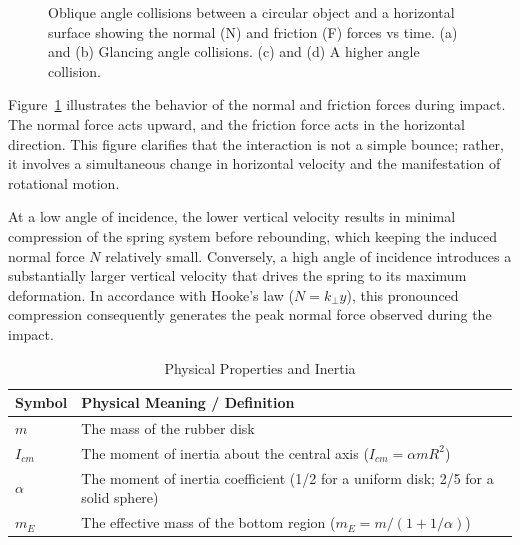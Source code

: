 \documentclass[11pt,letterpaper]{article}
\begin{document}
\begin{figure}[h!]
\caption{Oblique angle collisions between a circular object and a horizontal surface showing the normal (N) and friction (F) forces vs time. (a) and (b) Glancing angle collisions. (c) and (d) A higher angle collision.}
\label{fig:sample_plot}
\end{figure}

\noindent Figure~\ref{fig:sample_plot} illustrates the behavior of the normal and friction forces during impact. The normal force acts upward, and the friction force acts in the horizontal direction. This figure clarifies that the interaction is not a simple bounce; rather, it involves a simultaneous change in horizontal velocity and the manifestation of rotational motion.

At a low angle of incidence, the lower vertical velocity results in minimal compression of the spring system before rebounding, which keeping the induced normal force $N$ relatively small. Conversely, a high angle of incidence introduces a substantially larger vertical velocity that drives the spring to its maximum deformation. In accordance with Hooke's law ($N = k_\perp y$), this pronounced compression consequently generates the peak normal force observed during the impact.

\begin{table}[h!]   
\centering
\caption{Physical Properties and Inertia}
\label{tab:physical_props}
\begin{tabular}{ll}
\toprule
\textbf{Symbol} & \textbf{Physical Meaning / Definition} \\
\midrule
$m$ & The mass of the rubber disk \\
$I_{cm}$ & The moment of inertia about the central axis ($I_{cm} = \alpha m R^2$) \\
$\alpha$ & The moment of inertia coefficient (1/2 for a uniform disk; 2/5 for a solid sphere) \\
$m_E$ & The effective mass of the bottom region ($m_E = m/(1+1/\alpha)$) \\
\bottomrule
\end{tabular}
\end{table}
\end{document}
